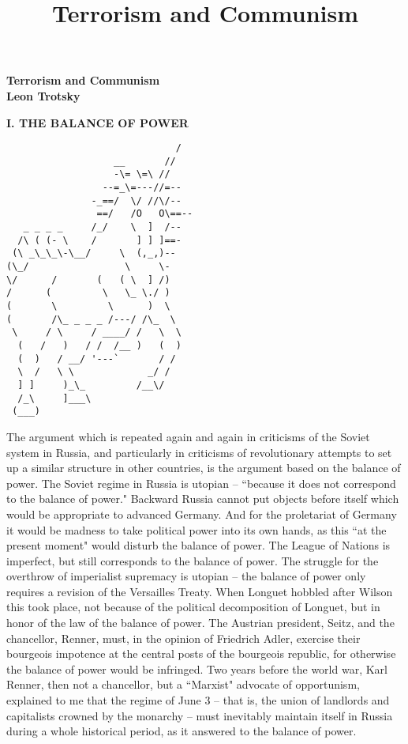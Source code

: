 \documentclass[12pt]{article}
\title{Terrorism and Communism}
\begin{document}
\thispagestyle{empty}
\begin{center}
\textbf{\Large Terrorism and Communism}\\
\textbf{Leon Trotsky}\\

\end{center}

\begin{center}
\textbf{\small I. \hspace{1em} THE BALANCE OF POWER
}
\end{center}
\begin{center}
\begin{verbatim}
                              /  
                   __       //   
                   -\= \=\ //    
                 --=_\=---//=--  
               -_==/  \/ //\/--  
                ==/   /O   O\==--
   _ _ _ _     /_/    \  ]  /--  
  /\ ( (- \    /       ] ] ]==-  
 (\ _\_\_\-\__/     \  (,_,)--   
(\_/                 \     \-    
\/      /       (   ( \  ] /)
/      (         \   \_ \./ )    
(       \         \      )  \    
(       /\_ _ _ _ /---/ /\_  \   
 \     / \     / ____/ /   \  \  
  (   /   )   / /  /__ )   (  )  
  (  )   / __/ '---`       / /   
  \  /   \ \             _/ /   
  ] ]     )_\_         /__\/     
  /_\     ]___\                  
 (___)                           
\end{verbatim}
\end{center}
\pagebreak


\vspace{12pt}
The argument which is repeated again and again in criticisms of the
Soviet system in Russia, and particularly in criticisms of
revolutionary attempts to set up a similar structure in other
countries, is the argument based on the balance of power. The Soviet
regime in Russia is utopian -- ``because it does not correspond to the
balance of power." Backward Russia cannot put objects before itself
which would be appropriate to advanced Germany. And for the
proletariat of Germany it would be madness to take political power
into its own hands, as this ``at the present moment" would disturb the
balance of power. The League of Nations is imperfect, but still
corresponds to the balance of power. The struggle for the overthrow of
imperialist supremacy is utopian -- the balance of power only requires a
revision of the Versailles Treaty. When Longuet hobbled after Wilson
this took place, not because of the political decomposition of
Longuet, but in honor of the law of the balance of power. The Austrian
president, Seitz, and the chancellor, Renner, must, in the opinion of
Friedrich Adler, exercise their bourgeois impotence at the central
posts of the bourgeois republic, for otherwise the balance of power
would be infringed. Two years before the world war, Karl Renner, then
not a chancellor, but a ``Marxist" advocate of opportunism, explained
to me that the regime of June 3 -- that is, the union of landlords and
capitalists crowned by the monarchy -- must inevitably maintain itself
in Russia during a whole historical period, as it answered to the
balance of power.
\end{document}
